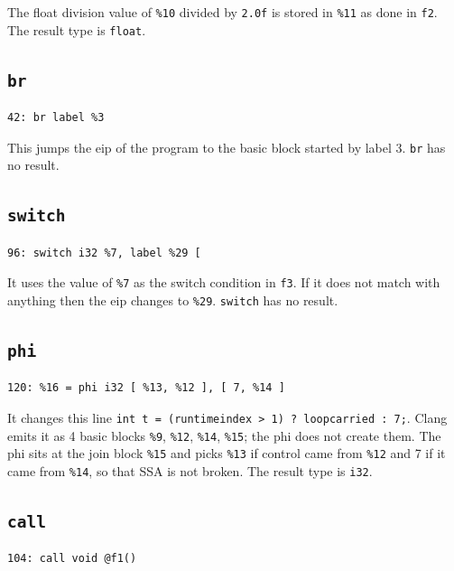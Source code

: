 \documentclass[11pt,a4paper]{article}
\begin{document}
The float division value of \texttt{\%10} divided by \texttt{2.0f} is stored in
\texttt{\%11} as done in \texttt{f2}. The result type is \texttt{float}.

\subsection*{\texttt{br}}

\begin{lstlisting}
42: br label %3
\end{lstlisting}

This jumps the eip of the program to the basic block started by label 3.
\texttt{br} has no result.

\subsection*{\texttt{switch}}

\begin{lstlisting}
96: switch i32 %7, label %29 [
\end{lstlisting}

It uses the value of \texttt{\%7} as the switch condition in \texttt{f3}. If it does
not match with anything then the eip changes to \texttt{\%29}. \texttt{switch} has no
result.

\subsection*{\texttt{phi}}

\begin{lstlisting}
120: %16 = phi i32 [ %13, %12 ], [ 7, %14 ]
\end{lstlisting}

It changes this line \texttt{int t = (runtimeindex > 1) ? loopcarried : 7;}.
Clang emits it as 4 basic blocks \texttt{\%9}, \texttt{\%12}, \texttt{\%14}, \texttt{\%15}; the phi
does not create them. The phi sits at the join block \texttt{\%15} and picks \texttt{\%13}
if control came from \texttt{\%12} and 7 if it came from \texttt{\%14}, so that SSA is not
broken. The result type is \texttt{i32}.

\subsection*{\texttt{call}}

\begin{lstlisting}
104: call void @f1()
\end{lstlisting}
\end{document}
